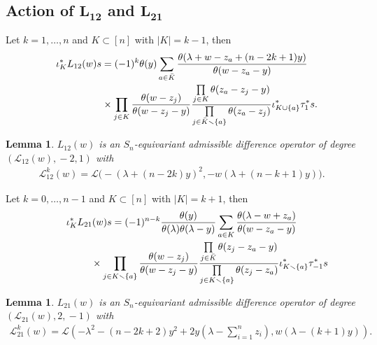 \documentclass[10pt,a4paper]{amsart}
\numberwithin{equation}{section}
\newtheorem{Lemma}[Theorem]{Lemma}
\begin{document}
\subsection[Action of $L_{12}$ and $L_{21}$]{Action of $\boldsymbol{L_{12}}$ and $\boldsymbol{L_{21}}$}\label{ss-6.2}
Let $k=1,\dots,n$ and $K\subset[n]$ with $|K|=k-1$, then
\begin{gather*} \iota^*_K L_{12}(w)s =(-1)^k\theta(y)\sum_{a\in \bar K} \frac {\theta(\lambda+w-z_a+(n-2k+1)y)} {\theta(w-z_a-y)} \\
\hphantom{\iota^*_K L_{12}(w)s =}{} \times \prod_{j\in K} \frac {\theta(w-z_j)} {\theta(w-z_j-y)} \frac {\prod\limits_{j\in K} \theta(z_a-z_j-y) } { \prod\limits_{j\in \bar K\smallsetminus\{a\}} \theta(z_a-z_j) } \iota_{K\cup\{a\}}^*\tau_1^*s.
\end{gather*}
\begin{Lemma}\label{l-L12} $L_{12}(w)$ is an $S_n$-equivariant admissible difference operator of degree $(\mathcal L_{12}(w),\!{-}2,1)$ with
 \begin{gather*}
 \mathcal L^k_{12}(w)=\mathcal L\big({-}(\lambda+(n-2k)y)^2,-w(\lambda+(n-k+1)y)\big).
 \end{gather*}
\end{Lemma}
Let $k=0,\dots,n-1$ and $K\subset[n]$ with $|K|=k+1$, then
\begin{gather*}
\iota^*_K L_{21}(w)s =(-1)^{n-k} \frac {\theta(y)}{\theta(\lambda)\theta(\lambda-y)} \sum_{a\in K} \frac{\theta(\lambda-w+z_a)} {\theta(w-z_a-y)} \\
\hphantom{\iota^*_K L_{21}(w)s =}{} \times \prod_{j\in K\smallsetminus\{a\}} \frac {\theta(w-z_j)} {\theta(w-z_j-y)} \frac {\prod\limits_{j\in \bar K} \theta(z_j-z_a-y) } {\prod\limits_{j\in K\smallsetminus\{a\}} \theta(z_j-z_a) }\iota_{K\smallsetminus\{a\}}^*\tau_{-1}^*s
\end{gather*}
\begin{Lemma}\label{l-L21} $L_{21}(w)$ is an $S_n$-equivariant admissible difference operator of degree $(\mathcal L_{21}(w),2,\!{-}1)$ with
 \begin{gather*}
 \mathcal L^k_{21}(w)=\mathcal L\left({-}\lambda^2-(n-2k+2)y^2+2y\left(\lambda-\sum_{i=1}^nz_i\right),w(\lambda-(k+1)y)\right).
 \end{gather*}
\end{Lemma}
\end{document}
